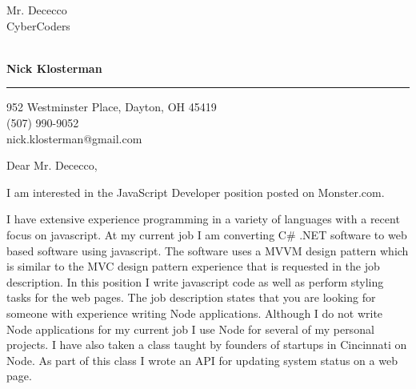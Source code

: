 \documentclass{letter} %
\makeatletter
\newcommand{\contactperson}{Mr. Dececco}
\newcommand{\contactCompany}{CyberCoders}
\newcommand{\contactStreetAddress}{ }  %
\newcommand{\contactCityStateZip}{ }
\newcommand{\position}{JavaScript Developer }%
\newcommand{\jobpostingsource}{Monster.com}
\newcommand{\personalphonenumber}{(507) 990-9052 }
\newcommand{\personalemail}{nick.klosterman@gmail.com}
\makeatother
\begin{document}
\signature{Nick Klosterman}           %
\longindentation=0pt                       %
\let\raggedleft\raggedright                %
 

 
\begin{letter}{\contactperson \\
\contactCompany \\
\contactStreetAddress \\
\contactCityStateZip

}

  \begin{flushright}
 \hfill   \large\bf Nick Klosterman  \\
\end{flushright}
\begin{flushright}
    \medskip\hrule height 1pt
    \hfill 952 Westminster Place, Dayton, OH 45419 \\
    \hfill \personalphonenumber \\
    \hfill \personalemail
  \end{flushright} 
\vfill %

 
\opening{Dear \contactperson ,} 

\noindent 
I am interested in the \position position posted on \jobpostingsource. 

\noindent
I have extensive experience programming in a variety of languages with a recent focus on javascript.
At my current job I am converting C\# .NET software to web based software using javascript.
The software uses a MVVM design pattern which is similar to the MVC design pattern experience that is requested in the job description.
In this position I write javascript code as well as perform styling tasks for the web pages.
The job description states that you are looking for someone with experience writing Node applications. Although I do not write Node applications for my current job I use Node for several of my personal projects.  I have also taken a class taught by founders of startups in Cincinnati on Node.  As part of this class I wrote an API for updating system status on a web page.


\end{letter}
\end{document}
